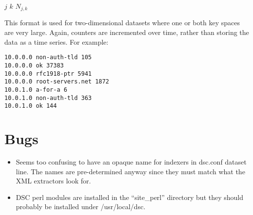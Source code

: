 \documentclass{report}
\begin{document}
\noindent
\begin{tt}$j$ $k$ $N_{j,k}$
\end{tt}

\vspace{1ex}\noindent
This format is used for two-dimensional datasets where one or both
key spaces are very large.  Again, counters are incremented over
time, rather than storing the data as a time series.
For example:

\begin{verbatim}
10.0.0.0 non-auth-tld 105
10.0.0.0 ok 37383
10.0.0.0 rfc1918-ptr 5941
10.0.0.0 root-servers.net 1872
10.0.1.0 a-for-a 6
10.0.1.0 non-auth-tld 363
10.0.1.0 ok 144
\end{verbatim}

\chapter{Bugs}

\begin{itemize}

\item
	Seems too confusing to have an opaque name for indexers in
	dsc.conf dataset line.  The names are pre-determined anyway
	since they must match what the XML extractors look for.

\item
	DSC perl modules are installed in the ``site\_perl'' directory
	but they should probably be installed under /usr/local/dsc.

\end{itemize}
\end{document}
